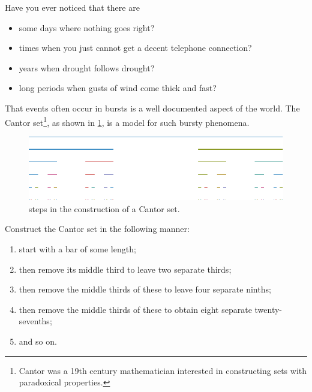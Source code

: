 \documentclass[12pt]{article}
\begin{document}
Have you ever noticed that there are    
\begin{itemize}
	\item  some days where nothing goes right?

	\item  times when you just cannot get a decent telephone connection?

	\item  years when drought follows drought?

	\item  long periods when gusts of wind come thick and fast?
\end{itemize}

\newpage

That events often occur in bursts 
is a well documented aspect of the world.  The Cantor 
set\footnote{Cantor was a 19th century mathematician interested in 
constructing sets with paradoxical properties.}, as shown in 
\cref{F:cantor}, is a model 
for such bursty phenomena.  
\begin{figure}
	\centering
	\includegraphics[width=\linewidth]{cantor}
	\caption{steps in the construction of a Cantor set.}
	\label{F:cantor}
\end{figure}

\newpage

Construct the Cantor set in the following 
manner:
\begin{enumerate}
	\item  start with a bar of some length; 

	\item  then remove its middle third to leave two separate thirds; 

	\item  then remove the middle thirds of these to leave four separate ninths; 

	\item  then remove the middle thirds of these to 
	obtain eight separate twenty-sevenths; 

	\item  and so on.  
\end{enumerate}

\newpage
\end{document}
